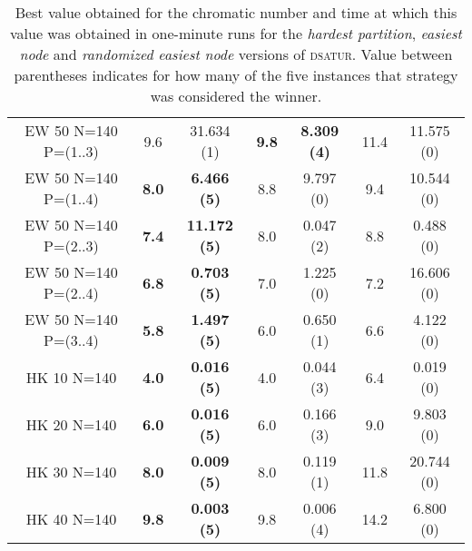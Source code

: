 \begin{table}
\begin{tabular}{|c|cc|cc|cc|}
\\
EW 50 N=140 P=(1..3) & 9.6 & 31.634 (1) & \textbf{9.8} & \textbf{8.309 (4)} & 11.4 & 11.575 (0)
\\
EW 50 N=140 P=(1..4) & \textbf{8.0} & \textbf{6.466 (5)} & 8.8 & 9.797 (0) & 9.4 & 10.544 (0)
\\
EW 50 N=140 P=(2..3) & \textbf{7.4} & \textbf{11.172 (5)} & 8.0 & 0.047 (2) & 8.8 & 0.488 (0)
\\
EW 50 N=140 P=(2..4) & \textbf{6.8} & \textbf{0.703 (5)} & 7.0 & 1.225 (0) & 7.2 & 16.606 (0)
\\
EW 50 N=140 P=(3..4) & \textbf{5.8} & \textbf{1.497 (5)} & 6.0 & 0.650 (1) & 6.6 & 4.122 (0)
\\
HK 10 N=140 & \textbf{4.0} & \textbf{0.016 (5)} & 4.0 & 0.044 (3) & 6.4 & 0.019 (0)
\\
HK 20 N=140 & \textbf{6.0} & \textbf{0.016 (5)} & 6.0 & 0.166 (3) & 9.0 & 9.803 (0)
\\
HK 30 N=140 & \textbf{8.0} & \textbf{0.009 (5)} & 8.0 & 0.119 (1) & 11.8 & 20.744 (0)
\\
HK 40 N=140 & \textbf{9.8} & \textbf{0.003 (5)} & 9.8 & 0.006 (4) & 14.2 & 6.800 (0)
\\
\hline 
 \end{tabular}
 
\caption{Best value obtained for the chromatic number and time at which this value was obtained in one-minute runs for the \textit{hardest partition}, \textit{easiest node} and \textit{randomized easiest node} versions of \textsc{dsatur}. Value between parentheses indicates for how many of the five instances that strategy was considered the winner.}
\label{table:pdsatur:comp}

\end{table}